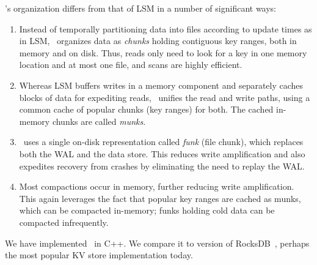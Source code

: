 \sys's organization differs from that of LSM  in a number of significant ways: 
\begin{enumerate}
\item Instead of temporally partitioning data into files according to update times as in LSM, 
\sys\ organizes data as  \emph{chunks} holding contiguous key ranges, both in memory and on disk. 
Thus, reads
only need to look for a key in one memory location and at most one file, and  scans are highly efficient.

\item Whereas LSM buffers writes in a memory component and separately caches blocks of data for expediting reads,
\sys\ unifies the read and write paths, using a common cache of popular chunks (key ranges) for both. 
The cached in-memory chunks are called \emph{munks}. 
\item \sys\ uses 
a single on-disk representation called \emph{funk} (file chunk), which replaces both the WAL
and the data store.  
This reduces write amplification %
and also 
expedites recovery from crashes by eliminating the need to replay the WAL. 
\item Most compactions occur in memory, further reducing write amplification. This again leverages the fact that popular key ranges are cached as munks, which can be compacted in-memory; funks holding cold data can be compacted infrequently. 
 \end{enumerate}


We have implemented \sys\ in C++. We compare it to version  of RocksDB~\cite{rocks}, perhaps the most popular KV store implementation today.  




